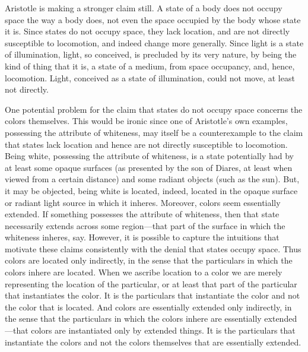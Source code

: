 Aristotle is making a stronger claim still. A state of a body does not occupy space the way a body does, not even the space occupied by the body whose state it is. Since states do not occupy space, they lack location, and are not directly susceptible to locomotion, and indeed change more generally. Since light is a state of illumination, light, so conceived, is precluded by its very nature, by being the kind of thing that it is, a state of a medium, from space occupancy, and, hence, locomotion. Light, conceived as a state of illumination, could not move, at least not directly.

One potential problem for the claim that states do not occupy space concerns the colors themselves. This would be ironic since one of Aristotle's own examples, possessing the attribute of whiteness, may itself be a counterexample to the claim that states lack location and hence are not directly susceptible to locomotion. Being white, possessing the attribute of whiteness, is a state potentially had by at least some opaque surfaces (as presented by the son of Diares, at least when viewed from a certain distance) and some radiant objects (such as the sun). But, it may be objected, being white is located, indeed, located in the opaque surface or radiant light source in which it inheres. Moreover, colors seem essentially extended. If something possesses the attribute of whiteness, then that state necessarily extends across some region---that part of the surface in which the whiteness inheres, say. However, it is possible to capture the intuitions that motivate these claims consistently with the denial that states occupy space. Thus colors are located only indirectly, in the sense that the particulars in which the colors inhere are located. When we ascribe location to a color we are merely representing the location of the particular, or at least that part of the particular that instantiates the color. It is the particulars that instantiate the color and not the color that is located. And colors are essentially extended only indirectly, in the sense that the particulars in which the colors inhere are essentially extended---that colors are instantiated only by extended things. It is the particulars that instantiate the colors and not the colors themselves that are essentially extended.

